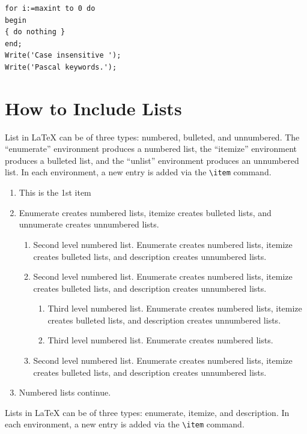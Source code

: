 \documentclass[12pt,a4paper]{article}
\begin{document}
\begin{minipage}{\hsize}%
\lstset{language=Pascal}%
\begin{lstlisting}[frame=single,framexleftmargin=-1pt,framexrightmargin=-17pt,framesep=12pt,linewidth=0.95\textwidth]
for i:=maxint to 0 do
begin
{ do nothing }
end;
Write('Case insensitive ');
Write('Pascal keywords.');
\end{lstlisting}
\end{minipage}


\section{How to Include Lists}\label{sec7}

List in \LaTeX{} can be of three types: numbered, bulleted, and unnumbered. The ``enumerate'' environment produces a numbered list, the 
``itemize'' environment produces a bulleted list, and the ``unlist''
environment produces an unnumbered list.
In each environment, a new entry is added via the \verb+\item+ command.

\begin{enumerate}[label=\arabic*.]
\item This is the 1st item
\item Enumerate creates numbered lists, itemize creates bulleted lists, and unnumerate creates unnumbered lists.

\begin{enumerate}[label=\alph*.]
\item Second level numbered list. Enumerate creates numbered lists, itemize creates bulleted lists, and description creates unnumbered lists.
\item Second level numbered list. Enumerate creates numbered lists, itemize creates bulleted lists, and description creates unnumbered lists.

\begin{enumerate}[label=(\roman*)]
\item Third level numbered list. Enumerate creates numbered lists, itemize creates bulleted lists, and description creates unnumbered lists.
\item Third level numbered list. Enumerate creates numbered lists.
\end{enumerate}

\item Second level numbered list. Enumerate creates numbered lists, itemize creates bulleted lists, and description creates unnumbered lists.
\end{enumerate}

\item Numbered lists continue.
\end{enumerate}
Lists in \LaTeX{} can be of three types: enumerate, itemize, and description.
In each environment, a new entry is added via the \verb+\item+ command.
\end{document}
